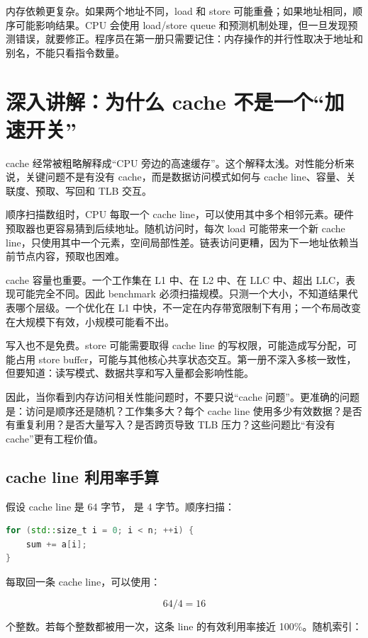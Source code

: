 内存依赖更复杂。如果两个地址不同，load 和 store 可能重叠；如果地址相同，顺序可能影响结果。CPU 会使用 load/store queue 和预测机制处理，但一旦发现预测错误，就要修正。程序员在第一册只需要记住：内存操作的并行性取决于地址和别名，不能只看指令数量。

\section{深入讲解：为什么 cache 不是一个“加速开关”}

cache 经常被粗略解释成“CPU 旁边的高速缓存”。这个解释太浅。对性能分析来说，关键问题不是有没有 cache，而是数据访问模式如何与 cache line、容量、关联度、预取、写回和 TLB 交互。

顺序扫描数组时，CPU 每取一个 cache line，可以使用其中多个相邻元素。硬件预取器也更容易猜到后续地址。随机访问时，每次 load 可能带来一个新 cache line，只使用其中一个元素，空间局部性差。链表访问更糟，因为下一地址依赖当前节点内容，预取也困难。

cache 容量也重要。一个工作集在 L1 中、在 L2 中、在 LLC 中、超出 LLC，表现可能完全不同。因此 benchmark 必须扫描规模。只测一个大小，不知道结果代表哪个层级。一个优化在 L1 中快，不一定在内存带宽限制下有用；一个布局改变在大规模下有效，小规模可能看不出。

写入也不是免费。store 可能需要取得 cache line 的写权限，可能造成写分配，可能占用 store buffer，可能与其他核心共享状态交互。第一册不深入多核一致性，但要知道：读写模式、数据共享和写入量都会影响性能。

因此，当你看到内存访问相关性能问题时，不要只说“cache 问题”。更准确的问题是：访问是顺序还是随机？工作集多大？每个 cache line 使用多少有效数据？是否有重复利用？是否大量写入？是否跨页导致 TLB 压力？这些问题比“有没有 cache”更有工程价值。

\subsection{cache line 利用率手算}

假设 cache line 是 64 字节， 是 4 字节。顺序扫描：

\begin{lstlisting}[language=C++,caption={顺序扫描}]
for (std::size_t i = 0; i < n; ++i) {
    sum += a[i];
}
\end{lstlisting}

每取回一条 cache line，可以使用：

\[
64 / 4 = 16
\]

个整数。若每个整数都被用一次，这条 line 的有效利用率接近 100\%。随机索引：

